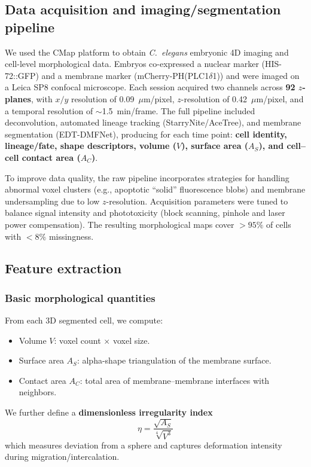 \documentclass[unnumsec,webpdf,modern,large,namedate]{oup-authoring-template}%
\theoremstyle{thmstyleone}\newtheorem{theorem}{Theorem}
\theoremstyle{thmstyletwo}\newtheorem{example}{Example}
\theoremstyle{thmstylethree}\newtheorem{definition}{Definition}
\begin{document}
\subsection{Data acquisition and imaging/segmentation pipeline}
We used the CMap platform to obtain \textit{C.~elegans} embryonic 4D imaging and cell-level morphological data. Embryos co-expressed a nuclear marker (HIS-72::GFP) and a membrane marker (mCherry-PH(PLC1$\delta$1)) and were imaged on a Leica SP8 confocal microscope. Each session acquired two channels across \textbf{92 $z$-planes}, with $x/y$ resolution of 0.09~$\mu$m/pixel, $z$-resolution of 0.42~$\mu$m/pixel, and a temporal resolution of $\sim$1.5~min/frame. The full pipeline included deconvolution, automated lineage tracking (StarryNite/AceTree), and membrane segmentation (EDT-DMFNet), producing for each time point: \textbf{cell identity, lineage/fate, shape descriptors, volume ($V$), surface area ($A_S$), and cell--cell contact area ($A_C$)}.

To improve data quality, the raw pipeline incorporates strategies for handling abnormal voxel clusters (e.g., apoptotic ``solid'' fluorescence blobs) and membrane undersampling due to low $z$-resolution. Acquisition parameters were tuned to balance signal intensity and phototoxicity (block scanning, pinhole and laser power compensation). The resulting morphological maps cover $>95\%$ of cells with $<8\%$ missingness.

\subsection{Feature extraction}

\subsubsection{Basic morphological quantities}
From each 3D segmented cell, we compute:
\begin{itemize}
    \item Volume $V$: voxel count $\times$ voxel size.
    \item Surface area $A_S$: alpha-shape triangulation of the membrane surface.
    \item Contact area $A_C$: total area of membrane--membrane interfaces with neighbors.
\end{itemize}
We further define a \textbf{dimensionless irregularity index}
\begin{equation}
\eta = \frac{\sqrt{A_S}}{\sqrt[4]{V^3}}
\label{eq:irregularity-index}
\end{equation}
which measures deviation from a sphere and captures deformation intensity during migration/intercalation.
\end{document}
